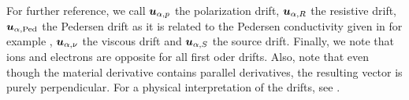 %
For further reference, we call $\boldsymbol{u}_{\alpha,p}$ the polarization drift, $\boldsymbol{u}_{\alpha,R}$ the resistive drift, $\boldsymbol{u}_{\alpha,\text{Ped}}$ the Pedersen drift as it is related to the Pedersen conductivity given in for example \cite{Baumjohann1997book}, $\boldsymbol{u}_{\alpha,\nu}$ the viscous drift and $\boldsymbol{u}_{\alpha,S}$ the source drift.
Finally, we note that ions and electrons are opposite for all first oder drifts.
Also, note that even though the material derivative contains parallel derivatives, the resulting vector is purely perpendicular.
For a physical interpretation of the drifts, see \cite{Garcia2003}.
